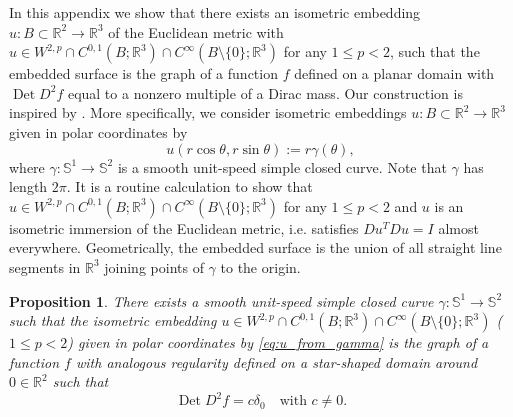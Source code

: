 \documentclass[12pt]{article}
\newcommand{\R}{\mathbb{R}}
\newcommand{\Det}{\operatorname{Det}}
\theoremstyle{plain}
\newtheorem{proposition}[theorem]{Proposition}
\numberwithin{equation}{section}
\begin{document}
In this appendix we show that there exists an isometric embedding $u : B \subset \R^2 \to \R^3$ of the Euclidean metric with $ u \in W^{2,p} \cap C^{0,1}(B;\R^3) \cap C^\infty(B \setminus \{0\};\R^3)$ for any $1 \leq p < 2$, such that the embedded surface is the graph of a function $f$ defined on a planar domain with $\Det D^2f$ equal to a nonzero multiple of a Dirac mass. Our construction is inspired by \cite{liu_maly}. More specifically, we consider isometric embeddings $u : B \subset \R^2 \to \R^3$ given in polar coordinates by
\begin{equation} \label{eq:u_from_gamma}
        u(r\cos\theta,r\sin\theta) := r\gamma(\theta),
\end{equation}
where $\gamma: \mathbb{S}^1 \to \mathbb{S}^2$ is a smooth unit-speed simple closed curve. Note that $\gamma$ has length $2\pi$. It is a routine calculation to show that $u \in W^{2,p}\cap C^{0,1}(B;\R^3) \cap C^\infty(B \setminus \{0\};\R^3)$ for any $1 \leq p < 2$ and $u$ is an isometric immersion of the Euclidean metric, i.e. satisfies $Du^T Du = I$ almost everywhere. Geometrically, the embedded surface is the union of all straight line segments in $\R^3$ joining points of $\gamma$ to the origin.

\begin{proposition} \label{prop:cone_example}
    There exists a smooth unit-speed simple closed curve $\gamma : \mathbb{S}^1 \to \mathbb{S}^2$ such that the isometric embedding $u \in W^{2,p}\cap C^{0,1}(B;\R^3) \cap C^\infty(B \setminus \{0\};\R^3)$ ($1 \leq p < 2$) given in polar coordinates by \eqref{eq:u_from_gamma} is the graph of a function $f$ with analogous regularity defined on a star-shaped domain around $0 \in \R^2$ such that 
    \begin{equation*}
        \Det D^2f = c\delta_0 \quad \text{with } c \neq 0.
    \end{equation*}
\end{proposition}
\end{document}
